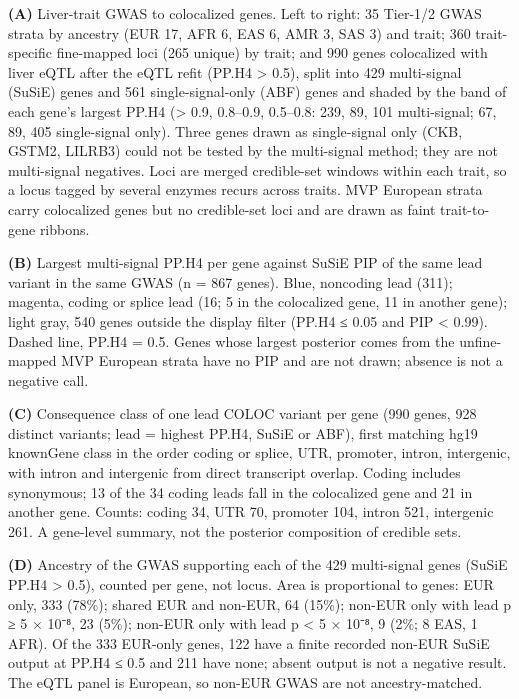 \textbf{(A)} Liver-trait GWAS to colocalized genes. Left to right: 35 Tier-1/2 GWAS strata by ancestry (EUR 17, AFR 6, EAS 6, AMR 3, SAS 3) and trait; 360 trait-specific fine-mapped loci (265 unique) by trait; and 990 genes colocalized with liver eQTL after the eQTL refit (PP.H4 \textgreater{} 0.5), split into 429 multi-signal (SuSiE) genes and 561 single-signal-only (ABF) genes and shaded by the band of each gene's largest PP.H4 (\textgreater{} 0.9, 0.8--0.9, 0.5--0.8: 239, 89, 101 multi-signal; 67, 89, 405 single-signal only). Three genes drawn as single-signal only (CKB, GSTM2, LILRB3) could not be tested by the multi-signal method; they are not multi-signal negatives. Loci are merged credible-set windows within each trait, so a locus tagged by several enzymes recurs across traits. MVP European strata carry colocalized genes but no credible-set loci and are drawn as faint trait-to-gene ribbons.

\textbf{(B)} Largest multi-signal PP.H4 per gene against SuSiE PIP of the same lead variant in the same GWAS (n = 867 genes). Blue, noncoding lead (311); magenta, coding or splice lead (16; 5 in the colocalized gene, 11 in another gene); light gray, 540 genes outside the display filter (PP.H4 ≤ 0.05 and PIP \textless{} 0.99). Dashed line, PP.H4 = 0.5. Genes whose largest posterior comes from the unfine-mapped MVP European strata have no PIP and are not drawn; absence is not a negative call.

\textbf{(C)} Consequence class of one lead COLOC variant per gene (990 genes, 928 distinct variants; lead = highest PP.H4, SuSiE or ABF), first matching hg19 knownGene class in the order coding or splice, UTR, promoter, intron, intergenic, with intron and intergenic from direct transcript overlap. Coding includes synonymous; 13 of the 34 coding leads fall in the colocalized gene and 21 in another gene. Counts: coding 34, UTR 70, promoter 104, intron 521, intergenic 261. A gene-level summary, not the posterior composition of credible sets.

\textbf{(D)} Ancestry of the GWAS supporting each of the 429 multi-signal genes (SuSiE PP.H4 \textgreater{} 0.5), counted per gene, not locus. Area is proportional to genes: EUR only, 333 (78\%); shared EUR and non-EUR, 64 (15\%); non-EUR only with lead p ≥ 5 × 10⁻⁸, 23 (5\%); non-EUR only with lead p \textless{} 5 × 10⁻⁸, 9 (2\%; 8 EAS, 1 AFR). Of the 333 EUR-only genes, 122 have a finite recorded non-EUR SuSiE output at PP.H4 ≤ 0.5 and 211 have none; absent output is not a negative result. The eQTL panel is European, so non-EUR GWAS are not ancestry-matched.

